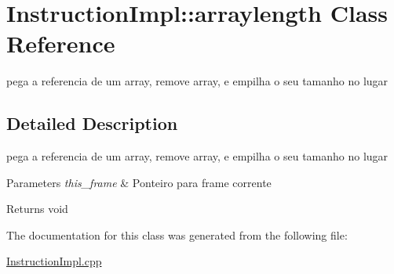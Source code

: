 \hypertarget{class_instruction_impl_1_1arraylength}{}\section{Instruction\+Impl\+:\+:arraylength Class Reference}
\label{class_instruction_impl_1_1arraylength}


pega a referencia de um array, remove array, e empilha o seu tamanho no lugar  




\subsection{Detailed Description}
pega a referencia de um array, remove array, e empilha o seu tamanho no lugar 


\begin{DoxyParams}{Parameters}
{\em this\+\_\+frame} & Ponteiro para frame corrente \\
\hline
\end{DoxyParams}
\begin{DoxyReturn}{Returns}
void 
\end{DoxyReturn}


The documentation for this class was generated from the following file\+:\begin{DoxyCompactItemize}
\item 
\hyperlink{_instruction_impl_8cpp}{Instruction\+Impl.\+cpp}\end{DoxyCompactItemize}
